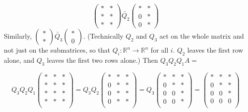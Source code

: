 \begin{equation*}
\begin{pmatrix}
\ast & \ast \\
\ast & \ast \\
\ast & \ast 
\end{pmatrix}
\underrightarrow{Q_2}
\begin{pmatrix}
\ast & \ast \\
0 & \ast \\
0 & \ast 
\end{pmatrix}
\end{equation*}
Similarly, $ \begin{pmatrix} \ast \\ \ast \end{pmatrix} \underrightarrow{Q_3} \begin{pmatrix} \ast \\ 0 \end{pmatrix} $.
(Technically $Q_2$ and $Q_3$ act on the whole matrix and not just on the submatrices, so that $Q_i: \mathbb{R}^n \rightarrow \mathbb{R}^n$ for all $i$. 
$Q_2$ leaves the first row alone, and $Q_3$ leaves the first two rows alone.) Then $Q_3 Q_2 Q_1 A =$ 

\begin{equation*}
Q_3 Q_2 Q_1
\begin{pmatrix}
\ast & \ast & \ast \\
\ast & \ast & \ast \\
\ast & \ast & \ast \\
\ast & \ast & \ast \\
\end{pmatrix}
= Q_3 Q_2
\begin{pmatrix}
\ast & \ast & \ast \\
0 & \ast & \ast \\
0 & \ast & \ast \\
0 & \ast & \ast \\
\end{pmatrix}
= Q_3
\begin{pmatrix}
\ast & \ast & \ast \\
0 & \ast & \ast \\
0 & 0 & \ast \\
0 & 0 & \ast \\
\end{pmatrix}
= 
\begin{pmatrix}
\ast & \ast & \ast \\
0 & \ast & \ast \\
0 & 0 & \ast \\
0 & 0 & 0 \\
\end{pmatrix}
\end{equation*}

